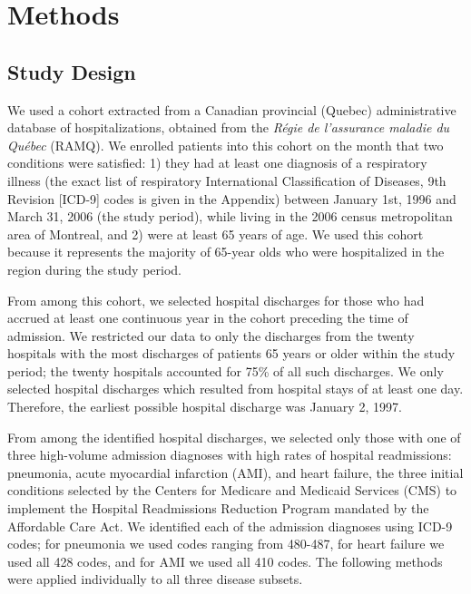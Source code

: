 \documentclass[]{article}\usepackage[]{graphicx}\usepackage[]{color}
\begin{document}
\section{Methods}

\subsection{Study Design}
We used a cohort extracted from a Canadian provincial (Quebec) administrative database of hospitalizations, obtained from the \emph{Régie de l'assurance maladie du Québec} (RAMQ). We enrolled patients into this cohort on the month that two conditions were satisfied: 1) they had at least one diagnosis of a respiratory illness (the exact list of respiratory International Classification of Diseases, 9th Revision [ICD-9] codes is given in the Appendix) between January 1st, 1996 and March 31, 2006 (the study period), while living in the 2006 census metropolitan area of Montreal, and 2) were at least 65 years of age. We used this cohort because it represents the majority of 65-year olds who were hospitalized in the region during the study period. 

From among this cohort, we selected hospital discharges for those who had accrued at least one continuous year in the cohort preceding the time of admission. We restricted our data to only the discharges from the twenty hospitals with the most discharges of patients 65 years or older within the study period; the twenty hospitals accounted for 75\% of all such discharges.  We only selected hospital discharges which resulted from hospital stays of at least one day. Therefore, the 
earliest possible hospital discharge was January 2, 1997.

From among the identified hospital discharges, we selected only those with one of three high-volume admission diagnoses with high rates of hospital readmissions: pneumonia, acute myocardial infarction (AMI), and heart failure, the three initial conditions selected by the Centers for Medicare and Medicaid Services (CMS) to implement the Hospital Readmissions Reduction Program mandated by the Affordable Care Act. We identified each of the admission diagnoses using ICD-9 codes; for pneumonia we used codes ranging from 480-487, for heart failure we used all 428 codes, and for AMI we used all 410 codes. The following methods were applied individually to all three disease subsets. 
\end{document}
